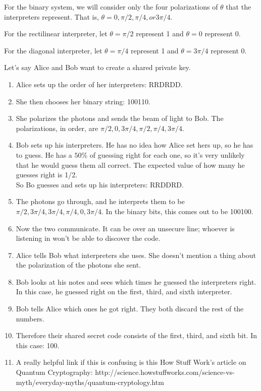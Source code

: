 \item For the binary system, we will consider only the four polarizations of $\theta$ that the interpreters represent. That is, $\theta = 0, \pi/2, \pi/4, or 3\pi/4$.
\item For the rectilinear interpreter, let $\theta=\pi/2$ represent 1 and $\theta=0$ represent 0.
\item For the diagonal interpreter, let $\theta=\pi/4$ represent 1 and $\theta=3\pi/4$ represent 0.
\begin{example}
\item Let's say Alice and Bob want to create a shared private key.
\begin{enumerate}
\item Alice sets up the order of her interpreters: RRDRDD.
\item She then chooses her binary string: 100110.
\item She polarizes the photons and sends the beam of light to Bob. The polarizations, in order, are $\pi/2, 0, 3\pi/4, \pi/2, \pi/4, 3\pi/4$.

\item Bob sets up his interpreters. He has no idea how Alice set hers up, so he has to guess. He has a $50\%$ of guessing right for each one, so it's very unlikely that he would guess them all correct. The expected value of how many he guesses right is 1/2.
\\ So Bo guesses and sets up his interpreters: RRDDRD.
\item The photons go through, and he interprets them to be $\pi/2, 3\pi/4, 3\pi/4, \pi/4, 0, 3\pi/4$.
In the binary bits, this comes out to be 100100.

\item Now the two communicate. It can be over an unsecure line; whoever is listening in won't be able to discover the code.
\item Alice tells Bob what interpreters she uses. She doesn't mention a thing about the polarization of the photons she sent.
\item Bob looks at his notes and sees which times he guessed the interpreters right. In this case, he guessed right on the first, third, and sixth interpreter.
\item Bob tells Alice which ones he got right. They both discard the rest of the numbers.
\item Therefore their shared secret code consists of the first, third, and sixth bit. In this case: 100.
\item A really helpful link if this is confusing is this How Stuff Work's article on Quantum Cryptography: http://science.howstuffworks.com/science-vs-myth/everyday-myths/quantum-cryptology.htm
\end{enumerate}
\end{example}
